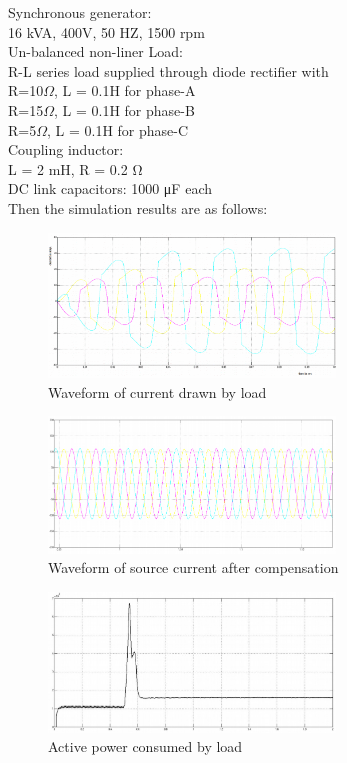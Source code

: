 \documentclass[journal,twoside]{IEEEtran}
\begin{document}
\bigskip
Synchronous generator:\\
16 kVA, 400V, 50 HZ, 1500 rpm\\
Un-balanced non-liner Load:\\
R-L series load supplied through diode rectifier with\\
R=10$\Omega$, L = 0.1H for phase-A\\
R=15$\Omega$, L = 0.1H for phase-B\\
R=5$\Omega$, L = 0.1H for phase-C\\
Coupling inductor:\\
L = 2 mH, R = 0.2 Ω\\
DC link capacitors: 1000 μF each\\



\bigskip
Then the simulation results are as follows:

\begin{figure}[!ht]
\centering
\includegraphics[width=3in]{10}
\caption{Waveform of current drawn by load}
\label{f10}
\end{figure}

\begin{figure}[!ht]
\centering
\includegraphics[width=3in]{11}
\caption{Waveform of source current after compensation}
\label{f11}
\end{figure}

\begin{figure}[!ht]
\centering
\includegraphics[width=3in]{12}
\caption{Active power consumed by load}
\label{f12}
\end{figure}
\end{document}
